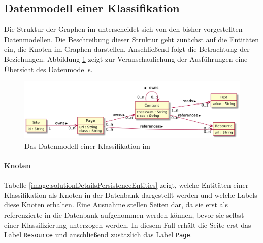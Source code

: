\subsection{Datenmodell einer Klassifikation}
    \label{section:solutionDetailsPersistenceDataModel}
    Die Struktur der Graphen im {\classificationStorage} unterscheidet
    sich von den bisher vorgestellten Datenmodellen.
    Die Beschreibung dieser Struktur geht zunächst auf die Entitäten ein,
    die Knoten im Graphen darstellen.
    Anschließend folgt die Betrachtung der Beziehungen.
    Abbildung \ref{image:dbDataModelOverview} zeigt zur Veranschaulichung
    der Ausführungen eine Übersicht des Datenmodells.

    \begin{figure}
        \centering
        \includegraphics[scale=\imageScalingFactor]{../resources/db-data-model/nodes.png}
        \caption{Das Datenmodell einer Klassifikation im {\classificationStorage}}
        \label{image:dbDataModelOverview}
    \end{figure}

    \paragraph{Knoten}
    Tabelle \ref{image:solutionDetailsPersistenceEntities} zeigt,
    welche Entitäten einer Klassifikation als Knoten in der Datenbank dargestellt werden
    und welche Labels diese Knoten erhalten.
    Eine Ausnahme stellen Seiten dar,
    da sie erst als referenzierte {\resources} in die Datenbank aufgenommen werden können,
    bevor sie selbst einer Klassifizierung unterzogen werden.
    In diesem Fall erhält die Seite erst das Label \texttt{Resource} und anschließend zusätzlich
    das Label \texttt{Page}.

